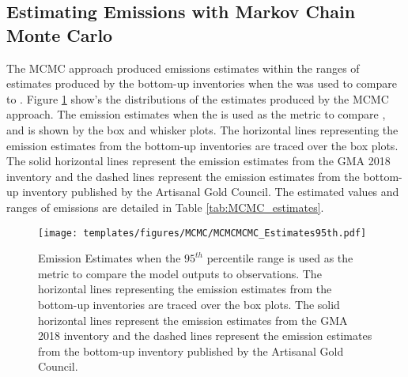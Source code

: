 \subsection{Estimating Emissions with Markov Chain Monte Carlo}
The MCMC approach produced \hg emissions estimates within the ranges of estimates produced by the bottom-up inventories when the \nft was used to compare \obsC to \modelc. Figure \ref{fig:MCMC_estimates95th} show's the distributions of the estimates produced by the MCMC approach. The \hg emission estimates when the \nft is used as the metric to compare \modelc, and \obsC is shown by the box and whisker plots. The horizontal lines representing the emission estimates from the bottom-up inventories are traced over the box plots. The solid horizontal lines represent the emission estimates from the GMA 2018 inventory \cite{united_nations_environment_programme_technical_2019,steenhuisen_development_2019} and the dashed lines represent the emission estimates from the bottom-up inventory published by the Artisanal Gold Council\cite{agc_reporte_2017}. The estimated values and ranges of emissions are detailed in Table \ref{tab:MCMC_estimates}. 
\begin{figure}[H]
  \texttt{[image: templates/figures/MCMC/MCMCMCMC\_Estimates95th.pdf]}
  \centering
  \caption[Emission Estimates when the $95^{th}$ percentile range is used as the metric to compare the model outputs to observations.]{Emission Estimates when the $95^{th}$ percentile range is used as the metric to compare the model outputs to observations. The horizontal lines representing the emission estimates from the bottom-up inventories are traced over the box plots. The solid horizontal lines represent the emission estimates from the GMA 2018 inventory \cite{united_nations_environment_programme_technical_2019,steenhuisen_development_2019} and the dashed lines represent the emission estimates from the bottom-up inventory published by the Artisanal Gold Council\cite{agc_reporte_2017}.}
  \label{fig:MCMC_estimates95th}
\end{figure}
\FloatBarrier

